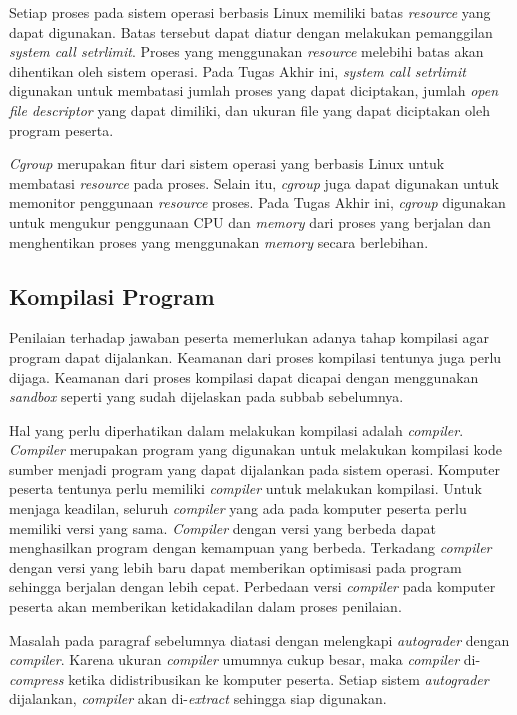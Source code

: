 \par Setiap proses pada sistem operasi berbasis Linux memiliki batas \textit{resource} yang dapat digunakan. Batas tersebut dapat diatur dengan melakukan pemanggilan \textit{system call setrlimit}. Proses yang menggunakan \textit{resource} melebihi batas akan dihentikan oleh sistem operasi. Pada Tugas Akhir ini, \textit{system call setrlimit} digunakan untuk membatasi jumlah proses yang dapat diciptakan, jumlah \textit{open file descriptor} yang dapat dimiliki, dan ukuran file yang dapat diciptakan oleh program peserta.

\par \textit{Cgroup} merupakan fitur dari sistem operasi yang berbasis Linux untuk membatasi \textit{resource} pada proses. Selain itu, \textit{cgroup} juga dapat digunakan untuk memonitor penggunaan \textit{resource} proses. Pada Tugas Akhir ini, \textit{cgroup} digunakan untuk mengukur penggunaan CPU dan \textit{memory} dari proses yang berjalan dan menghentikan proses yang menggunakan \textit{memory} secara berlebihan.

\subsection{Kompilasi Program}

\par Penilaian terhadap jawaban peserta memerlukan adanya tahap kompilasi agar program dapat dijalankan. Keamanan dari proses kompilasi tentunya juga perlu dijaga. Keamanan dari proses kompilasi dapat dicapai dengan menggunakan \textit{sandbox} seperti yang sudah dijelaskan pada subbab sebelumnya.

\par Hal yang perlu diperhatikan dalam melakukan kompilasi adalah \textit{compiler}. \textit{Compiler} merupakan program yang digunakan untuk melakukan kompilasi kode sumber menjadi program yang dapat dijalankan pada sistem operasi. Komputer peserta tentunya perlu memiliki \textit{compiler} untuk melakukan kompilasi. Untuk menjaga keadilan, seluruh \textit{compiler} yang ada pada komputer peserta perlu memiliki versi yang sama. \textit{Compiler} dengan versi yang berbeda dapat menghasilkan program dengan kemampuan yang berbeda. Terkadang \textit{compiler} dengan versi yang lebih baru dapat memberikan optimisasi pada program sehingga berjalan dengan lebih cepat. Perbedaan versi \textit{compiler} pada komputer peserta akan memberikan ketidakadilan dalam proses penilaian.

\par Masalah pada paragraf sebelumnya diatasi dengan melengkapi \textit{autograder} dengan \textit{compiler}. Karena ukuran \textit{compiler} umumnya cukup besar, maka \textit{compiler} di-\textit{compress} ketika didistribusikan ke komputer peserta. Setiap sistem \textit{autograder} dijalankan, \textit{compiler} akan di-\textit{extract} sehingga siap digunakan.

